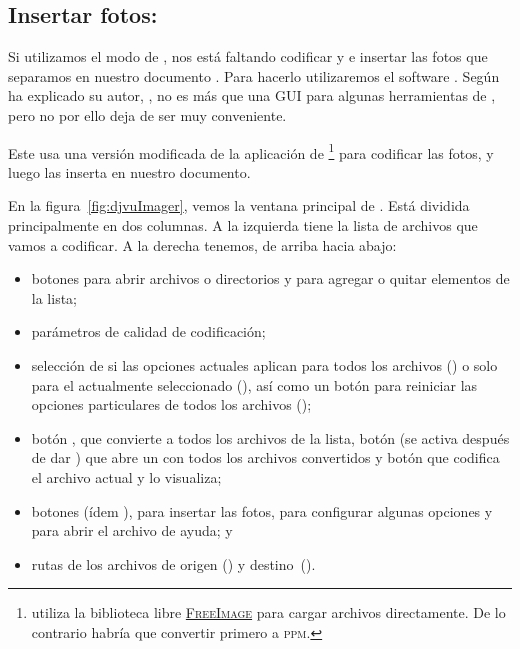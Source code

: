 \documentclass[%
	a5paper,
	10pt,
	twoside,
	openright,
	final,
]{memoir}
\begin{document}

	\subsection{Insertar fotos: \djvuimager\label{sec:djvuImager}} Si utilizamos el modo  de \scantailor, nos está faltando codificar y e insertar las fotos que separamos en nuestro documento \djvu. Para hacerlo utilizaremos el software \djvuimager. Según ha explicado su autor, \mondaytwothousand, no es más que una GUI para algunas herramientas de \djvulibre, pero no por ello deja de ser muy conveniente.

	Este usa una versión modificada de la aplicación  de \djvulibre\footnote{ utiliza la biblioteca libre \href{http://freeimage.sourceforge.net/}{\textsc{FreeImage}} para cargar archivos \tiff directamente. De lo contrario habría que convertir primero a \textsc{ppm}.} para codificar las fotos, y luego las inserta en nuestro documento.

	En la figura~\ref{fig:djvuImager}, vemos la ventana principal de \djvuimager. Está dividida principalmente en dos columnas. A la izquierda tiene la lista de archivos que vamos a codificar. A la derecha tenemos, de arriba hacia abajo:
	\begin{itemize}[noitemsep]
		\item botones para abrir archivos o directorios y para agregar o quitar elementos de la lista;
		\item parámetros de calidad de codificación;
		\item selección de si las opciones actuales aplican para todos los archivos () o solo para el actualmente seleccionado (), así como un botón para reiniciar las opciones particulares de todos los archivos ();
		\item botón , que convierte a \djvu todos los archivos de la lista, botón  (se activa después de dar ) que abre un \djvu con todos los archivos convertidos y botón  que codifica el archivo actual y lo visualiza;
		\item botones  (ídem ), para insertar las fotos,  para configurar algunas opciones y  para abrir el archivo de ayuda; y
		\item rutas de los archivos de origen () y destino~().
	\end{itemize} 
\end{document}
